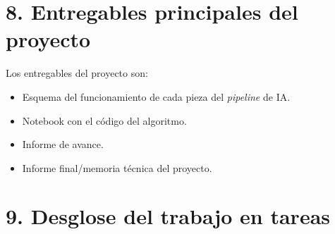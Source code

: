 \documentclass[
11pt, %
]{charter}
\begin{document}
\section{8. Entregables principales del proyecto}
\label{sec:entregables}

Los entregables del proyecto son:

\begin{itemize}
	\item Esquema del funcionamiento de cada pieza del \textit{pipeline} de IA.
	\item Notebook con el código del algoritmo.
	\item Informe de avance.
	\item Informe final/memoria técnica del proyecto.
\end{itemize}

\section{9. Desglose del trabajo en tareas}
\label{sec:wbs}
\end{document}
